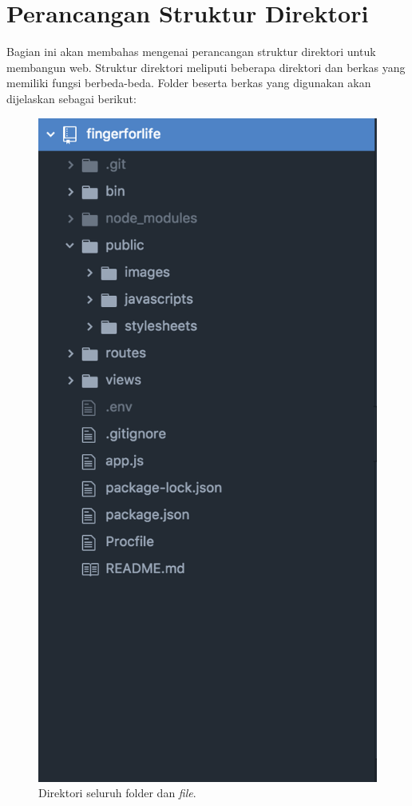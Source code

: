\section{Perancangan Struktur Direktori}

Bagian ini akan membahas mengenai perancangan struktur direktori untuk membangun web. Struktur direktori meliputi beberapa direktori dan berkas yang memiliki fungsi berbeda-beda. Folder beserta berkas yang digunakan akan dijelaskan sebagai berikut:

\begin{figure}[H]
	\centering
	\includegraphics[scale=0.4]{Gambar/direktori}
	\caption{Direktori seluruh folder dan \textit{file}.}
	\label{fig:direktori}
\end{figure}


